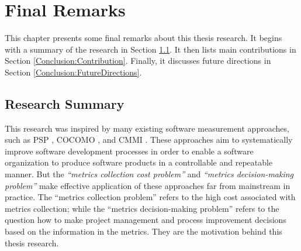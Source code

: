 \chapter{Final Remarks}  \label{Chapter:Conclusion}

This chapter presents some final remarks about this thesis research. 
It begins with a summary of the research in Section \ref{Conclusion:ResearchSummary}.
It then lists main contributions in Section \ref{Conclusion:Contribution}.
Finally, it discusses future directions in Section \ref{Conclusion:FutureDirections}.




\section{Research Summary} \label{Conclusion:ResearchSummary}

This research was inspired by many existing software measurement approaches, such as PSP \cite{Humphrey:1995, Humphrey:1996}, COCOMO \cite{Cocomo:1981, Cocomo:2000}, and CMMI \cite{Royce:2002}. These approaches aim to systematically improve software development processes in order to enable a software organization to produce software products in a controllable and repeatable manner. But the \textit{``metrics collection cost problem''} and \textit{``metrics decision-making problem''} make effective application of these approaches far from mainstream in practice. The ``metrics collection problem'' refers to the high cost associated with metrics collection; while the ``metrics decision-making problem'' refers to the question how to make project management and process improvement decisions based on the information in the metrics. They are the motivation behind this thesis research.

